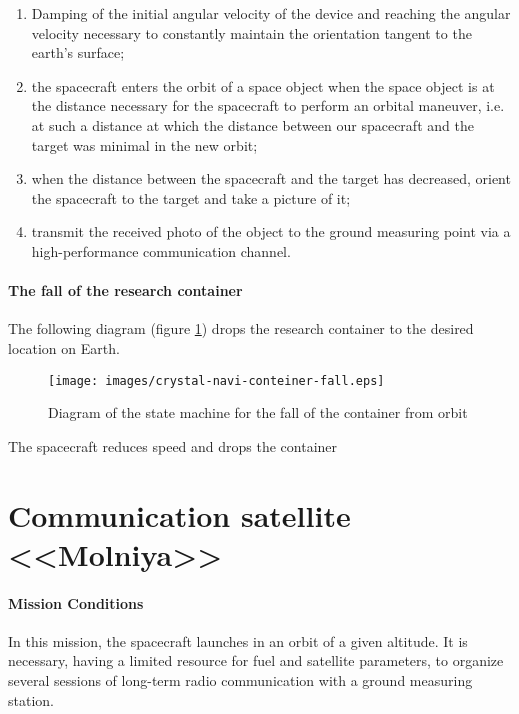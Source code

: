 \documentclass[12pt,a4paper]{article}
\begin{document}
\begin{enumerate}
\item Damping of the initial angular velocity of the device and reaching the angular velocity necessary to constantly maintain the orientation tangent to the earth's surface;
\item the spacecraft enters the orbit of a space object when the space object is at the distance necessary for the spacecraft to perform an orbital maneuver, i.e. at such a distance at which the distance between our spacecraft and the target was minimal in the new orbit;
\item when the distance between the spacecraft and the target has decreased, orient the spacecraft to the target and take a picture of it;
\item transmit the received photo of the object to the ground measuring point via a high-performance communication channel.
\end{enumerate}

\paragraph{The fall of the research container} The following diagram (figure \ref{Pic:Сrystal-navi-conteiner-fall-en}) drops the research container to the desired location on Earth.

\begin{figure}[tbh]
  \begin{center}
    \texttt{[image: images/crystal-navi-conteiner-fall.eps]}
    \caption{Diagram of the state machine for the fall of the container from orbit}
    \label{Pic:Сrystal-navi-conteiner-fall-en}
  \end{center}
\end{figure}

The spacecraft reduces speed and drops the container

\section{Communication satellite <<Molniya>>}

\paragraph{Mission Conditions} In this mission, the spacecraft launches in an orbit of a given altitude. It is necessary, having a limited resource for fuel and satellite parameters, to organize several sessions of long-term radio communication with a ground measuring station.
\end{document}
